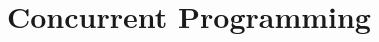 \documentclass[main.tex]{subfiles}
\begin{document}
\chapter{Concurrent Programming}
\end{document}
